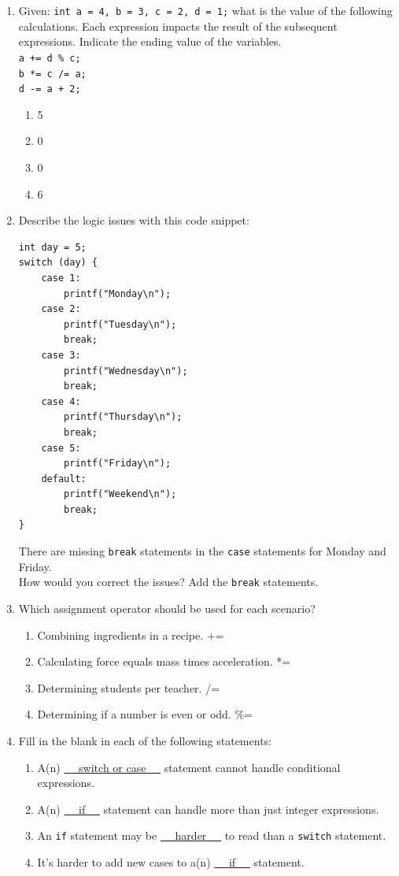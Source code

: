 \documentclass[letter,11pt]{article}
\begin{document}
\begin{enumerate}
    \item Given: \texttt{int a = 4, b = 3, c = 2, d = 1;} what is the value of the following calculations. Each expression impacts the result of the subsequent expressions. Indicate the ending value of the variables. \\
    \texttt{a += d \% c;} \\
    \texttt{b *= c /= a;} \\
    \texttt{d -= a + 2;}
    \begin{enumerate}
        \item {\color{red}5}
        \item {\color{red}0}
        \item {\color{red}0}
        \item {\color{red}6}
    \end{enumerate}
    
    \item Describe the logic issues with this code snippet:
    \begin{verbatim}
int day = 5;
switch (day) {
    case 1:
        printf("Monday\n");
    case 2:
        printf("Tuesday\n");
        break;
    case 3:
        printf("Wednesday\n");
        break;
    case 4:
        printf("Thursday\n");
        break;
    case 5:
        printf("Friday\n");
    default:
        printf("Weekend\n");
        break;
}
    \end{verbatim}
    {\color{red}There are missing \texttt{break} statements in the \texttt{case} statements for Monday and Friday.} \\
    How would you correct the issues? {\color{red}Add the \texttt{break} statements.}
    
    \item Which assignment operator should be used for each scenario?
    \begin{enumerate}
        \item Combining ingredients in a recipe. {\color{red}+=}
        \item Calculating force equals mass times acceleration. {\color{red}*=}
        \item Determining students per teacher. {\color{red}/=}
        \item Determining if a number is even or odd. {\color{red}\%=}
    \end{enumerate}
    
    \item Fill in the blank in each of the following statements:
    \begin{enumerate}
        \item A(n) \underline{~~ switch or case ~~} statement cannot handle conditional expressions.
        \item A(n) \underline{~~ if ~~} statement can handle more than just integer expressions.
        \item An \texttt{if} statement may be \underline{~~ harder ~~} to read than a \texttt{switch} statement.
        \item It's harder to add new cases to a(n) \underline{~~ if ~~} statement.
    \end{enumerate}
    

\end{enumerate}
\end{document}
